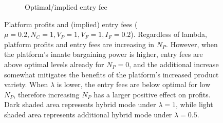 \documentclass[a4paper]{article}
\begin{document}
\begin{figure}
\begin{subfigure}[b]{0.45\textwidth}
        \caption{Optimal/implied entry fee}
        \label{fig:entry_fee_low_lambda}
    \end{subfigure}
    \caption{Platform profits and (implied) entry fees ($\mu = 0.2, N_C = 1, V_P = 1, V_F = 1, I_F = 0.2$). Regardless of lambda, platform profits and entry fees are increasing in $N_P$. However, when the platform's innate bargaining power is higher, entry fees are above optimal levels already for $N_P = 0$, and the additional increase somewhat mitigates the benefits of the platform's increased product variety. When $\lambda$ is lower, the entry fees are below optimal for low $N_P$, therefore increasing $N_P$ has a larger positive effect on profits. Dark shaded area represents hybrid mode under $\lambda=1$, while light shaded area represents additional hybrid mode under $\lambda=0.5$.}
    \label{fig:profits_and_entry_fees_low_lambda}
\end{figure}
\end{document}

